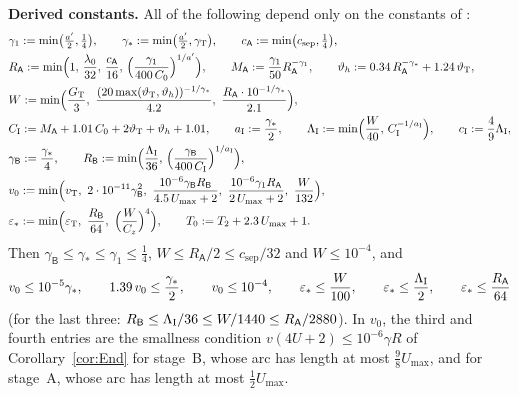 \medskip\noindent\textbf{Derived constants.} All of the following depend only on the constants of \MHT:
\begin{equation}\label{eq:T2-const}
\begin{aligned}
&\gamma_1:=\min\bigl(\tfrac{a'}2,\tfrac14\bigr),\qquad\gamma_*:=\min\bigl(\tfrac{a'}2,\gamma_{\mathrm T}\bigr),\qquad
c_{\mathsf A}:=\min\bigl(c_{\mathrm{sep}},\tfrac14\bigr),\\
&R_{\mathsf A}:=\min\Bigl(1,\,\frac{\lambda_0}{32},\,\frac{c_{\mathsf A}}{16},\,\Bigl(\frac{\gamma_1}{400\,C_0}\Bigr)^{1/a'}\Bigr),
\qquad M_{\mathsf A}:=\frac{\gamma_1}{50}R_{\mathsf A}^{-\gamma_1},\qquad
\vartheta_h:=0.34\,R_{\mathsf A}^{-\gamma_*}+1.24\,\vartheta_{\mathrm T},\\
&W:=\min\Bigl(\frac{G_{\mathrm T}}3,\ \frac{(20\max(\vartheta_{\mathrm T},\vartheta_h))^{-1/\gamma_*}}{4.2},\
\frac{R_{\mathsf A}\cdot10^{-1/\gamma_*}}{2.1}\Bigr),\\
&\MCI:=M_{\mathsf A}+1.01\,C_0+2\vartheta_{\mathrm T}+\vartheta_h+1.01,\qquad\MaI:=\frac{\gamma_*}2,\qquad
\MLI:=\min\Bigl(\frac W{40},\,\MCI^{-1/\MaI}\Bigr),\qquad\McI:=\frac49\MLI,\\
&\gamma_{\mathsf B}:=\frac{\gamma_*}4,\qquad
R_{\mathsf B}:=\min\Bigl(\frac{\MLI}{36},\,\Bigl(\frac{\gamma_{\mathsf B}}{400\,\MCI}\Bigr)^{1/\MaI}\Bigr),\\
&v_0:=\min\Bigl(v_{\mathrm T},\ 2\cdot10^{-11}\gamma_{\mathsf B}^2,\ \frac{10^{-6}\gamma_{\mathsf B}R_{\mathsf B}}{4.5\,U_{\max}+2},\
\frac{10^{-6}\gamma_1R_{\mathsf A}}{2\,U_{\max}+2},\ \frac W{132}\Bigr),\\
&\varepsilon_*:=\min\Bigl(\varepsilon_{\mathrm T},\ \frac{R_{\mathsf B}}{64},\ \Bigl(\frac W{C_z}\Bigr)^4\Bigr),\qquad
T_0:=T_2+2.3\,U_{\max}+1 .
\end{aligned}
\end{equation}
Then $\gamma_{\mathsf B}\le\gamma_*\le\gamma_1\le\frac14$, $W\le R_{\mathsf A}/2\le c_{\mathrm{sep}}/32$ and $W\le10^{-4}$, and
\begin{equation}\label{eq:T2-also}
v_0\le10^{-5}\gamma_*,\qquad1.39\,v_0\le\frac{\gamma_*}2,\qquad v_0\le10^{-4},\qquad
\varepsilon_*\le\frac W{100},\qquad\varepsilon_*\le\frac{\Lambda_{\mathrm I}}2,\qquad\varepsilon_*\le\frac{R_{\mathsf A}}{64}
\end{equation}
(for the last three: $R_{\mathsf B}\le\Lambda_{\mathrm I}/36\le W/1440\le R_{\mathsf A}/2880$). In $v_0$, the third and fourth entries are the
smallness condition $v(4U+2)\le10^{-6}\gamma R$ of Corollary~\ref{cor:End} for stage~B, whose arc has length at most
$\frac98U_{\max}$, and for stage~A, whose arc has length at most $\frac12U_{\max}$.

